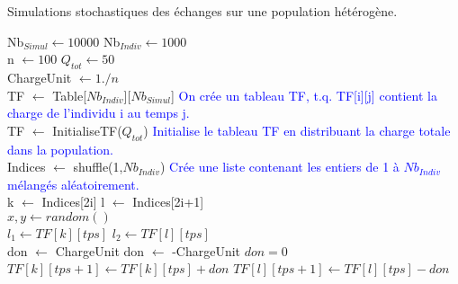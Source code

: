 \pagebreak

\begin{algorithm}
\caption{Simulations stochastiques des échanges sur une population hétérogène.}
\begin{algorithmic}

\State Nb$_{Simul} \gets 10000$
\State Nb$_{Indiv} \gets 1000$\\

\State n $\gets 100$
\State $Q_{tot} \gets 50$\\

\State ChargeUnit $\gets 1./n$\\


\State TF $\gets$ Table[$Nb_{Indiv}$][$Nb_{Simul}$]
\State \textcolor{blue}{On crée un tableau TF, t.q. TF[i][j] contient la charge de l'individu i au temps j.}\\
\State TF $\gets$ InitialiseTF($Q_{tot}$)
\State \textcolor{blue}{Initialise le tableau TF en distribuant la charge totale dans la population.}\\

	\State Indices $\gets$ shuffle(1,$Nb_{Indiv}$) 
	\State \textcolor{blue}{Crée une liste contenant les entiers de 1 à $Nb_{Indiv}$ mélangés aléatoirement.}\\
		\State k $\gets$ Indices[2i]
		\State l $\gets$ Indices[2i+1] \\
		
		\State $x,y \gets random()$\\
		
		\State $l_1 \gets TF[k][tps]$
		\State $l_2 \gets TF[l][tps]$\\
		
			\State don $\gets$ ChargeUnit 
			\State don $\gets$ -ChargeUnit 
		\Else
			\State $don=0$
		\EndIf \\
		
		\State $TF[k][tps+1] \gets TF[k][tps]+don$
        \State $TF[l][tps+1] \gets TF[l][tps]-don$\\
	\EndFor
\EndFor



\end{algorithmic}
\end{algorithm}

